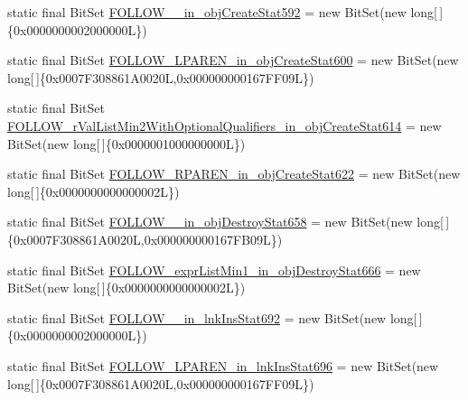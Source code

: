 \begin{DoxyCompactItemize}
\item 
static final Bit\-Set \hyperlink{classorg_1_1tzi_1_1use_1_1parser_1_1soil_1_1_soil_parser_adc4b53d9ec5564d27670aa57c109b08c}{F\-O\-L\-L\-O\-W\-\_\-\_\-in\-\_\-obj\-Create\-Stat592} = new Bit\-Set(new long\mbox{[}$\,$\mbox{]}\{0x0000000002000000\-L\})
\item 
static final Bit\-Set \hyperlink{classorg_1_1tzi_1_1use_1_1parser_1_1soil_1_1_soil_parser_ab51a2f2f8bf0c1589572213446dee44d}{F\-O\-L\-L\-O\-W\-\_\-\-L\-P\-A\-R\-E\-N\-\_\-in\-\_\-obj\-Create\-Stat600} = new Bit\-Set(new long\mbox{[}$\,$\mbox{]}\{0x0007\-F308861\-A0020\-L,0x000000000167\-F\-F09\-L\})
\item 
static final Bit\-Set \hyperlink{classorg_1_1tzi_1_1use_1_1parser_1_1soil_1_1_soil_parser_af5ae116b50f9f54eab0c48adf527e7f8}{F\-O\-L\-L\-O\-W\-\_\-r\-Val\-List\-Min2\-With\-Optional\-Qualifiers\-\_\-in\-\_\-obj\-Create\-Stat614} = new Bit\-Set(new long\mbox{[}$\,$\mbox{]}\{0x0000001000000000\-L\})
\item 
static final Bit\-Set \hyperlink{classorg_1_1tzi_1_1use_1_1parser_1_1soil_1_1_soil_parser_a7fc22997616515bb6a28bc751b4e98f1}{F\-O\-L\-L\-O\-W\-\_\-\-R\-P\-A\-R\-E\-N\-\_\-in\-\_\-obj\-Create\-Stat622} = new Bit\-Set(new long\mbox{[}$\,$\mbox{]}\{0x0000000000000002\-L\})
\item 
static final Bit\-Set \hyperlink{classorg_1_1tzi_1_1use_1_1parser_1_1soil_1_1_soil_parser_a0d807c0c664f9c07146fc5a15aed368f}{F\-O\-L\-L\-O\-W\-\_\-\_\-in\-\_\-obj\-Destroy\-Stat658} = new Bit\-Set(new long\mbox{[}$\,$\mbox{]}\{0x0007\-F308861\-A0020\-L,0x000000000167\-F\-B09\-L\})
\item 
static final Bit\-Set \hyperlink{classorg_1_1tzi_1_1use_1_1parser_1_1soil_1_1_soil_parser_ae227c783cbb952fae34888d5b8123630}{F\-O\-L\-L\-O\-W\-\_\-expr\-List\-Min1\-\_\-in\-\_\-obj\-Destroy\-Stat666} = new Bit\-Set(new long\mbox{[}$\,$\mbox{]}\{0x0000000000000002\-L\})
\item 
static final Bit\-Set \hyperlink{classorg_1_1tzi_1_1use_1_1parser_1_1soil_1_1_soil_parser_a45af8a3565e258a22f16d89cf01f658c}{F\-O\-L\-L\-O\-W\-\_\-\_\-in\-\_\-lnk\-Ins\-Stat692} = new Bit\-Set(new long\mbox{[}$\,$\mbox{]}\{0x0000000002000000\-L\})
\item 
static final Bit\-Set \hyperlink{classorg_1_1tzi_1_1use_1_1parser_1_1soil_1_1_soil_parser_a6a4a551b2b38cefd9a257c9f32ce8ac8}{F\-O\-L\-L\-O\-W\-\_\-\-L\-P\-A\-R\-E\-N\-\_\-in\-\_\-lnk\-Ins\-Stat696} = new Bit\-Set(new long\mbox{[}$\,$\mbox{]}\{0x0007\-F308861\-A0020\-L,0x000000000167\-F\-F09\-L\})

\end{DoxyCompactItemize}
